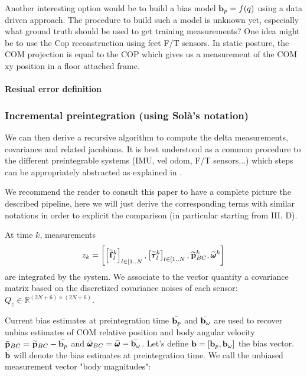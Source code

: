 \documentclass[11pt]{article}
\newcommand{\bias}{\bfb}
\newcommand{\posim}[2]{\prescript{#1}{}{\widetilde{\bfp}}_{#2}}
\newcommand{\posibar}{\bar{\bfp}}
\newcommand{\angvelm}[2]{\prescript{#1}{}{\widetilde{\pmb{\omega}}}_{#2}}
\newcommand{\angvelbar}{\bar{\pmb{\omega}}}
\newcommand{\forcem}[2]{\prescript{#1}{}{\widetilde{\bff}}_{#2}}
\newcommand{\torquem}[2]{\prescript{#1}{}{\widetilde{\pmb{\tau}}}_{#2}}
\newcommand{\Reals}{\mathbb{R}}
\begin{document}
Another interesting option would be to build a bias model $\bias_p = f(q)$ using a data driven approach. The procedure to build such a model is unknown yet, especially what ground truth should be used to get training measurements? One idea might be to use the Cop reconstruction using feet F/T sensors. In static posture, the COM projection is equal to the COP which gives us a measurement of the COM xy position in a floor attached frame.





\paragraph{Resiual error definition}


\subsubsection{Incremental preintegration (using Solà's notation)}
We can then derive a recursive algorithm to compute the delta measurements, covariance and related jacobians. It is best understood as a common procedure to the different preintegrable systems (IMU, vel odom, F/T sensors...) which steps can be appropriately abstracted as explained in \cite{atchuthan2018odometry}.  

We recommend the reader to consult this paper to have a complete picture the described pipeline, here we will just derive the corresponding terms with similar notations in order to explicit the comparison (in particular starting from III. D).

At time $k$, measurements
%
\begin{equation}
z_k = \left[ \left[\forcem{}{l}^k \right]_{l \in [1..N}, \left[\torquem{}{l}^k \right]_{l \in [1..N}, \posim{}{BC}^k, \angvelm{}{}^k \right]
\end{equation}
%
are integrated by the system. We associate to the vector quantity a covariance matrix based on the discretized covariance noises of each sensor: $Q_{z} \in \Reals^{(2N+6) \times (2N+6)}$.

Current bias estimates at preintegration time $\bar{\bias_p}$ and $\bar{\bias_{\omega}}$ are used to recover unbias estimates of COM relative position and body angular velocity $\posibar_{BC} = \posim{}{BC} - \bar{\bias_p}$ and $\angvelbar_{BC} = \angvelm{}{} - \bar{\bias_{\omega}}$. Let's define $\bias = \left[\bias_p, \bias_{\omega} \right]$ the bias vector. $\bar{\bias}$ will denote the bias estimates at preintegration time. We call the unbiased measurement vector "body magnitudes":
\end{document}
